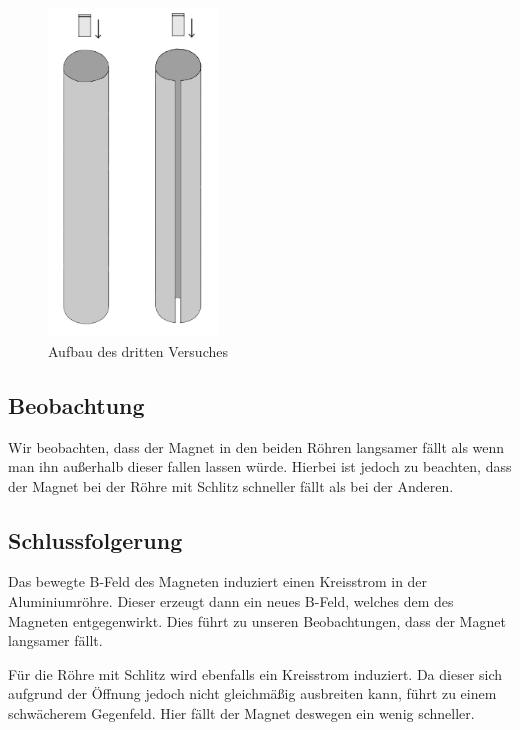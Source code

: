 \documentclass[11pt,a4paper,titlepage, ngerman]{article}
\begin{document}
		\begin{figure}
			\centering
			\includegraphics[width=0.4\textwidth]{Neodymmagnet.png}
			\caption{Aufbau des dritten Versuches} %
			\label{fig:Neodymmagnet}
		\end{figure}
		
		\subsection*{Beobachtung}
			
			Wir beobachten, dass der Magnet in den beiden Röhren langsamer fällt als wenn man ihn außerhalb dieser fallen lassen würde.
			Hierbei ist jedoch zu beachten, dass der Magnet bei der Röhre mit Schlitz schneller fällt als bei der Anderen.
			
		\subsection*{Schlussfolgerung}	
		
			Das bewegte B-Feld des Magneten induziert einen Kreisstrom in der Aluminiumröhre. Dieser erzeugt dann ein neues B-Feld, welches dem des Magneten entgegenwirkt. Dies führt zu unseren Beobachtungen, dass der Magnet langsamer fällt. %
			
			Für die Röhre mit Schlitz wird ebenfalls ein Kreisstrom induziert. Da dieser sich aufgrund der Öffnung jedoch nicht gleichmäßig ausbreiten kann, führt zu einem schwächerem Gegenfeld. Hier fällt der Magnet deswegen ein wenig schneller.		
					
\end{document}
